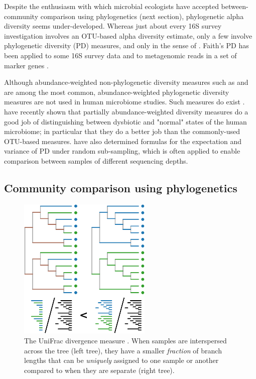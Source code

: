 \documentclass{amsart}
\newcommand{\forarxiv}[1]{#1}
\begin{document}
Despite the enthusiasm with which microbial ecologists have accepted between-community comparison using phylogenetics (next section), phylogenetic alpha diversity seems under-developed.
Whereas just about every 16S survey investigation involves an OTU-based alpha diversity estimate, only a few involve phylogenetic diversity (PD) measures, and only in the sense of \citet{faith1992conservation}.
Faith's PD has been applied to some 16S survey data \citep{lozupone2007global,costello2009bacterial} and to metagenomic reads in a set of marker genes \citep{kembel2011phylogenetic}.

Although abundance-weighted non-phylogenetic diversity measures such as \citet{simpson1949measurement} and \citet{shannon1948mathematical} are among the most common, abundance-weighted phylogenetic diversity measures are not used in human microbiome studies.
Such measures do exist \citep{rao1982diversity,barker2002phylogenetic,allen2009new,chao2010phylogenetic,vellend2011measuring}.
\citet{mccoy2013abundance} have recently shown that partially abundance-weighted diversity measures do a good job of distinguishing between dysbiotic and "normal" states of the human microbiome; in particular that they do a better job than the commonly-used OTU-based measures.
\citet{nipperess2013mean} have also determined formulas for the expectation and variance of PD under random sub-sampling, which is often applied to enable comparison between samples of different sequencing depths.

\subsection{Community comparison using phylogenetics}

\newcommand{\unifracLegend}{
    The UniFrac divergence measure \citep[figure adapted from][]{LozuponeKnightUniFrac05}.
    When samples are interspersed across the tree (left tree), they have a smaller \textit{fraction} of branch lengths that can be \textit{uniquely} assigned to one sample or another compared to when they are separate (right tree).
}
\forarxiv{
\begin{figure}
  \vspace{-19pt}
  \begin{center}
    \includegraphics[width=2.5in]{figures/unifrac.pdf}
  \end{center}
  \vspace{-10pt}
  \caption{\unifracLegend}
  \label{fig:unifrac}
\end{figure}
}
\end{document}
